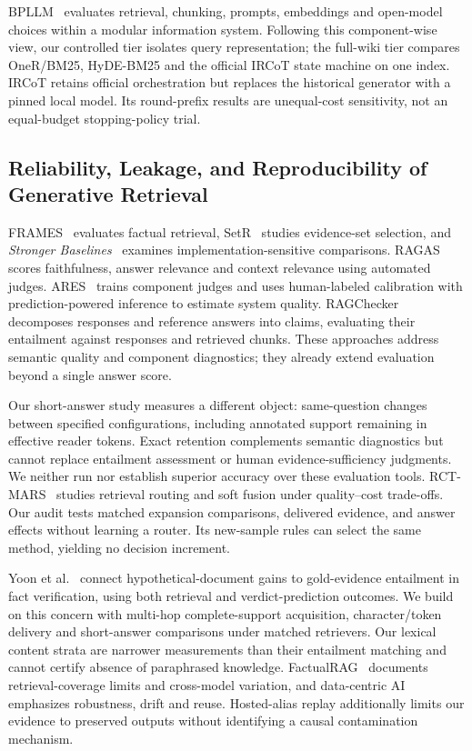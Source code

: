 BPLLM~\cite{bernardi2024bpllm} evaluates retrieval, chunking, prompts, embeddings and open-model choices within a modular information system. Following this component-wise view, our controlled tier isolates query representation; the full-wiki tier compares OneR/BM25, HyDE-BM25 and the official IRCoT state machine on one index. IRCoT retains official orchestration but replaces the historical generator with a pinned local model. Its round-prefix results are unequal-cost sensitivity, not an equal-budget stopping-policy trial.

\subsection{Reliability, Leakage, and Reproducibility of Generative Retrieval}
\label{sec:rw_reliability}

FRAMES~\cite{krishna-etal-2025-fact} evaluates factual retrieval, SetR~\cite{lee-etal-2025-shifting} studies evidence-set selection, and \emph{Stronger Baselines}~\cite{laitenberger-etal-2025-stronger} examines implementation-sensitive comparisons. RAGAS~\cite{es2023ragas} scores faithfulness, answer relevance and context relevance using automated judges. ARES~\cite{saadfalcon2023ares} trains component judges and uses human-labeled calibration with prediction-powered inference to estimate system quality. RAGChecker~\cite{ru2024ragchecker} decomposes responses and reference answers into claims, evaluating their entailment against responses and retrieved chunks. These approaches address semantic quality and component diagnostics; they already extend evaluation beyond a single answer score.

Our short-answer study measures a different object: same-question changes between specified configurations, including annotated support remaining in effective reader tokens. Exact retention complements semantic diagnostics but cannot replace entailment assessment or human evidence-sufficiency judgments. We neither run nor establish superior accuracy over these evaluation tools. RCT-MARS~\cite{srivastava2026rctmars} studies retrieval routing and soft fusion under quality--cost trade-offs. Our audit tests matched expansion comparisons, delivered evidence, and answer effects without learning a router. Its new-sample rules can select the same method, yielding no decision increment.

Yoon et al.~\cite{yoon2025knowledgeleakage} connect hypothetical-document gains to gold-evidence entailment in fact verification, using both retrieval and verdict-prediction outcomes. We build on this concern with multi-hop complete-support acquisition, character/token delivery and short-answer comparisons under matched retrievers. Our lexical content strata are narrower measurements than their entailment matching and cannot certify absence of paraphrased knowledge. FactualRAG~\cite{chang2026factualrag} documents retrieval-coverage limits and cross-model variation, and data-centric AI~\cite{malerba2024datacentric} emphasizes robustness, drift and reuse. Hosted-alias replay additionally limits our evidence to preserved outputs without identifying a causal contamination mechanism.
